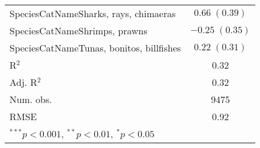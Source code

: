 \documentclass[]{article}
\begin{document}
\begin{table}[h]
\begin{center}
\begin{tabular}{l c }
SpeciesCatNameSharks, rays, chimaeras       & $0.66 \; (0.39)$        \\
SpeciesCatNameShrimps, prawns               & $-0.25 \; (0.35)$       \\
SpeciesCatNameTunas, bonitos, billfishes    & $0.22 \; (0.31)$        \\
\hline
R$^2$                                       & 0.32                    \\
Adj. R$^2$                                  & 0.32                    \\
Num. obs.                                   & 9475                    \\
RMSE                                        & 0.92                    \\
\hline
\multicolumn{2}{l}{\scriptsize{$^{***}p<0.001$, $^{**}p<0.01$, $^*p<0.05$}}
\end{tabular}
\label{table:coefficients}
\end{center}
\end{table}
\end{document}

